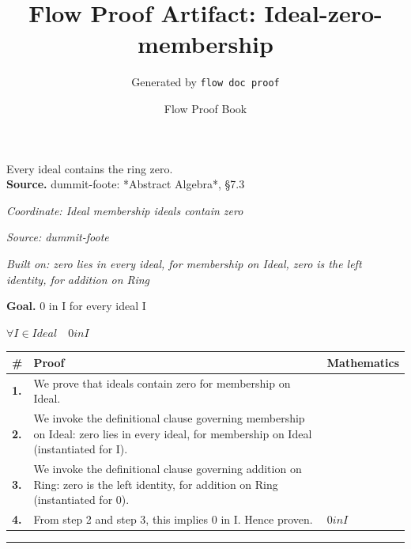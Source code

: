 \documentclass[11pt]{article}
\title{Flow Proof Artifact: Ideal-zero-membership}
\author{Generated by \texttt{flow doc proof}}
\date{Flow Proof Book}
\theoremstyle{definition}
\begin{document}
\maketitle
Every ideal contains the ring zero.\\[0.5em]
\textbf{Source.} dummit-foote: *Abstract Algebra*, §7.3\\[0.5em]
\bigskip
{}\par
\smallskip\noindent\textit{Coordinate: Ideal \cdot membership \cdot ideals contain zero}\par
\smallskip\noindent\textit{Source: dummit-foote}\par
\smallskip\noindent\textit{Built on: zero lies in every ideal, for membership on Ideal, zero is the left identity, for addition on Ring}\par
\medskip
\noindent\textbf{Goal.} 0 in I for every ideal I\par
\noindent$\displaystyle \forall I \in Ideal\quad 0 in I$\par
\medskip
\noindent
\begin{tabular}{@{} >{\raggedright\arraybackslash}p{} >{\raggedright\arraybackslash}p{} >{\raggedleft\arraybackslash}p{} @{}}
\textbf{\#} & \textbf{Proof} & \textbf{Mathematics} \\
\midrule
\textbf{1.} & We prove that ideals contain zero for membership on Ideal. & \\[0.45em]
\textbf{2.} & We invoke the definitional clause governing membership on Ideal: zero lies in every ideal, for membership on Ideal (instantiated for I). & \\[0.45em]
\textbf{3.} & We invoke the definitional clause governing addition on Ring: zero is the left identity, for addition on Ring (instantiated for 0). & \\[0.45em]
\textbf{4.} & From step 2 and step 3, this implies 0 in I. Hence proven. & $\displaystyle 0 in I$ \\[0.45em]
\bottomrule
\end{tabular}
\label{thm:Ideal-membership-ideals_contain_zero}
\par\medskip\hrule
\end{document}
